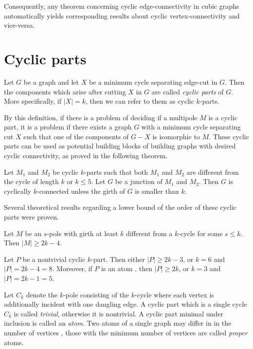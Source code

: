 \documentclass[12pt, twoside]{book}
\begin{document}
Consequently, any theorem concerning cyclic edge-connectivity in cubic graphs automatically yields corresponding results about cyclic vertex-connectivity and vice-versa.

\section{Cyclic parts}\label{sec:cyclic-parts}

\begin{definition}
	Let $G$ be a graph and let $X$ be a minimum cycle separating edge-cut in $G$. Then the components which arise after cutting $X$ in $G$ are called \textit{cyclic parts} of $G$. More specifically, if $|X|=k$, then we can refer to them as cyclic $k$-parts.
\end{definition}

By this definition, if there is a problem of deciding if a multipole $M$ is a cyclic part, it is a problem if there exists a graph $G$ with a minimum cycle separating cut $X$ such that one of the components of $G-X$ is isomorphic to $M$. These cyclic parts can be used as potential building blocks of building graphs with desired cyclic connectivity, as proved in the following theorem.

\begin{theorem}
	Let $M_1$ and $M_2$ be cyclic $k$-parts such that both $M_1$ and $M_2$ are diﬀerent from the cycle of length $k$ or $k\leq 5$. Let $G$ be a junction of $M_1$ and $M_2$. Then $G$ is cyclically $k$-connected unless the girth of $G$ is smaller than $k$.
\end{theorem}

Several theoretical results regarding a lower bound of the order of these cyclic parts were proven.

\begin{lemma}\label{lem:rajnik5.1}
	Let $M$ be an $s$-pole with girth at least $k$ different from a $k$-cycle for some $s\leq k$. Then $|M| \geq 2k - 4$.
\end{lemma}

\begin{theorem}
	Let $P$ be a nontrivial cyclic $k$-part. Then either $|P|\geq 2k-3$, or $k = 6$ and $|P|= 2k-4 = 8$. Moreover, if $P$ is an atom , then $|P| \geq 2k$, or $k = 3$ and $|P| = 2k-1 = 5$.
\end{theorem}

Let $C_k$ denote the $k$-pole consisting of the $k$-cycle where each vertex is additionally incident with one dangling edge. A cyclic part which is a single cycle $C_k$ is called \textit{trivial}, otherwise it is nontrivial. A cyclic part minimal under inclusion is called an \textit{atom}. Two atoms of a single graph may differ in in the number of vertices \cite{atoms-of-cyclic}, those with the minimum number of vertices are called \textit{proper} atoms.
\end{document}
